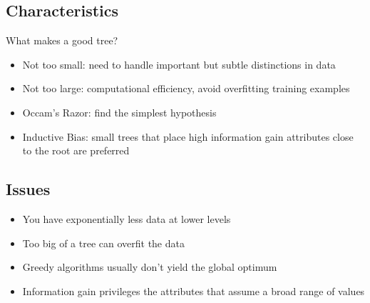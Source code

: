 \subsection{Characteristics}
What makes a good tree?
\begin{itemize}
    \item Not too small: need to handle important but subtle distinctions in data
    \item Not too large: computational efficiency, avoid overfitting training examples
    \item Occam's Razor: find the simplest hypothesis
    \item Inductive Bias: small trees that place high information gain attributes
    close to the root are preferred
\end{itemize}

\subsection{Issues}
\begin{itemize}
    \item You have exponentially less data at lower levels
    \item Too big of a tree can overfit the data
    \item Greedy algorithms usually don't yield the global optimum
    \item Information gain privileges the attributes that assume a broad range of values
\end{itemize}



\newpage